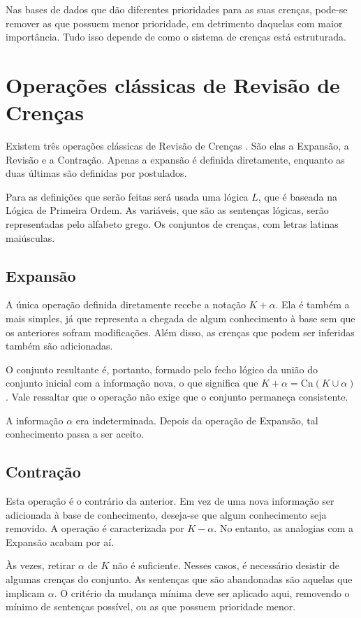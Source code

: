 Nas bases de dados que dão diferentes prioridades para as suas crenças, pode-se remover as que possuem menor prioridade, em detrimento daquelas com maior importância. Tudo isso depende de como o sistema de crenças está estruturada.

\section{Operações clássicas de Revisão de Crenças}

Existem três operações clássicas de Revisão de Crenças \cite{revisaoGardenfors3}. São elas a Expansão, a Revisão e a Contração. Apenas a expansão é definida diretamente, enquanto as duas últimas são definidas por postulados. 

Para as definições que serão feitas será usada uma lógica $ L $, que é baseada na Lógica de Primeira Ordem. As variáveis, que são as sentenças lógicas, serão representadas pelo alfabeto grego. Os conjuntos de crenças, com letras latinas maiúsculas.

\subsection{Expansão}

A única operação definida diretamente recebe a notação $ K + \alpha $. Ela é também a mais simples, já que representa a chegada de algum conhecimento à base sem que os anteriores sofram modificações. Além disso, as crenças que podem ser inferidas também são adicionadas.

O conjunto resultante é, portanto, formado pelo fecho lógico da união do conjunto inicial com a informação nova, o que significa que $ K + \alpha = \text{Cn}(K \cup \alpha) $. Vale ressaltar que o operação não exige que o conjunto permaneça consistente.

A informação $ \alpha $ era indeterminada. Depois da operação de Expansão, tal conhecimento passa a ser aceito.

\subsection{Contração}

Esta operação é o contrário da anterior. Em vez de uma nova informação ser adicionada à base de conhecimento, deseja-se que algum conhecimento seja removido. A operação é caracterizada por $ K - \alpha $. No entanto, as analogias com a Expansão acabam por aí.

Às vezes, retirar $ \alpha $ de $ K $ não é suficiente. Nesses casos, é necessário desistir de algumas crenças do conjunto. As sentenças que são abandonadas são aquelas que implicam $ \alpha $. O critério da mudança mínima deve ser aplicado aqui, removendo o mínimo de sentenças possível, ou as que possuem prioridade menor.

